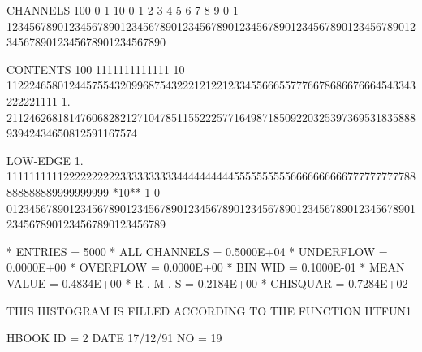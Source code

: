 \begin{Listing}
 CHANNELS 100   0                                                                                                  1   
           10   0        1         2         3         4         5         6         7         8         9         0   
            1   1234567890123456789012345678901234567890123456789012345678901234567890123456789012345678901234567890   
 
 CONTENTS 100                          1111111111111                                                                
           10                 112224658012445755432099687543222121221233455666557776678686676664543343222221111     
            1.       21124626818147606828212710478511552225771649871850922032539736953183588893942434650812591167574
 
 LOW-EDGE   1.            111111111122222222223333333333444444444455555555556666666666777777777788888888889999999999
 *10**  1   0   0123456789012345678901234567890123456789012345678901234567890123456789012345678901234567890123456789
 
 * ENTRIES =       5000      * ALL CHANNELS = 0.5000E+04      * UNDERFLOW = 0.0000E+00      * OVERFLOW = 0.0000E+00
 * BIN WID = 0.1000E-01      * MEAN VALUE   = 0.4834E+00      * R . M . S = 0.2184E+00
 * CHISQUAR  =  0.7284E+02

\newpage
 
 THIS HISTOGRAM IS FILLED ACCORDING TO THE FUNCTION HTFUN1                       
 
 HBOOK     ID =         2                                        DATE  17/12/91              NO =  19
 

\end{Listing}
